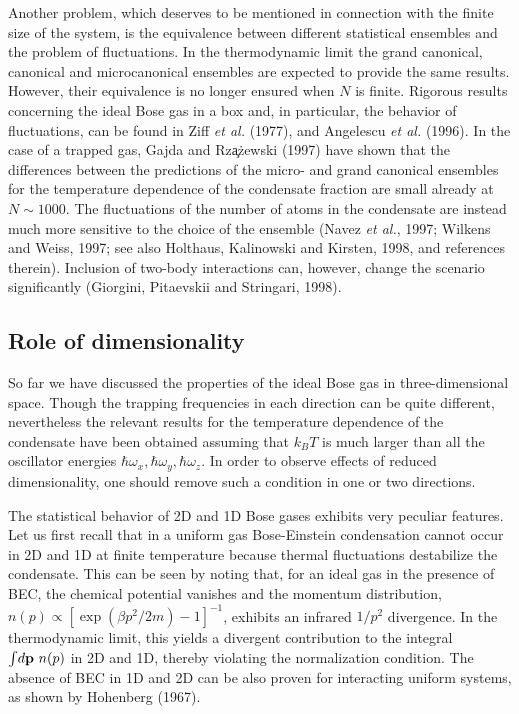 Another problem, which deserves to be mentioned in connection
with the finite size of the system, is the equivalence between 
different statistical ensembles and the problem of fluctuations. 
In the thermodynamic limit the grand canonical, canonical and 
microcanonical ensembles are expected to provide the same results. 
However, their equivalence is no longer ensured when $N$ is finite. 
Rigorous results concerning the ideal Bose gas in a box and, in 
particular, the behavior of fluctuations, can be found in Ziff 
{\it et al.} (1977), and Angelescu {\it et al.} (1996). In the case 
of a trapped gas, Gajda and  Rz\c{a}\.{z}ewski (1997) have  
shown that the differences between the predictions of the micro-
and grand canonical ensembles for the temperature dependence of 
the condensate fraction are small already at $N \sim 1000$.  
The fluctuations of the number of atoms in 
the condensate are instead much more sensitive to the choice of 
the ensemble (Navez {\it et al.}, 1997; Wilkens and Weiss, 1997; see 
also  Holthaus, Kalinowski and Kirsten, 1998, and references therein). 
Inclusion of two-body interactions can, however, change the scenario 
significantly (Giorgini, Pitaevskii and Stringari, 1998).


\subsection{Role of dimensionality}
\label{sec:dimensionality}

So far we have discussed the properties of the ideal Bose gas in 
three-dimensional space.  Though the trapping frequencies in each
direction can be quite different, nevertheless the relevant results 
for the temperature dependence of the condensate have been obtained
assuming that $k_BT$ is much larger than all the oscillator energies
$\hbar\omega_x,  \hbar\omega_y, \hbar\omega_z$. In order to
observe effects of reduced dimensionality,  one should remove
such a condition in one or two directions.

The statistical behavior of 2D and 1D Bose gases  exhibits very 
peculiar features. Let us first recall that in a uniform gas
Bose-Einstein condensation cannot occur in 2D and 1D at finite
temperature because thermal fluctuations destabilize the
condensate. This can be seen by noting that, for an ideal gas in 
the presence of BEC,  the chemical potential vanishes and the 
momentum distribution, $n(p) \propto [\exp(\beta p^2/2m)-1]^{-1}$, 
exhibits an infrared $1/p^2$ divergence. In the thermodynamic limit, 
this yields a divergent contribution to the integral $\int \! d{\bf p} 
\ n(p)$ in 2D and 1D, thereby violating the normalization condition. 
The absence of BEC in 1D and 2D can be also proven for interacting 
uniform systems, as shown by Hohenberg (1967). 

